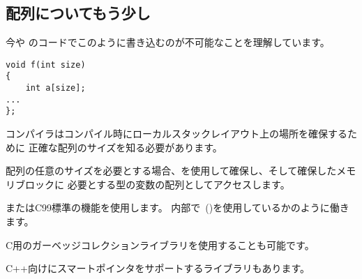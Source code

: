 ﻿\subsection{配列についてもう少し}

今や \CCpp のコードでこのように書き込むのが不可能なことを理解しています。

\begin{lstlisting}[style=customc]
void f(int size)
{
    int a[size];
...
};
\end{lstlisting}


コンパイラはコンパイル時にローカルスタックレイアウト上の場所を確保するために
正確な配列のサイズを知る必要があります。


配列の任意のサイズを必要とする場合、を使用して確保し、そして確保したメモリブロックに
必要とする型の変数の配列としてアクセスします。

またはC99標準の機能を使用します。
内部で~()を使用しているかのように働きます。

C用のガーベッジコレクションライブラリを使用することも可能です。

C++向けにスマートポインタをサポートするライブラリもあります。
